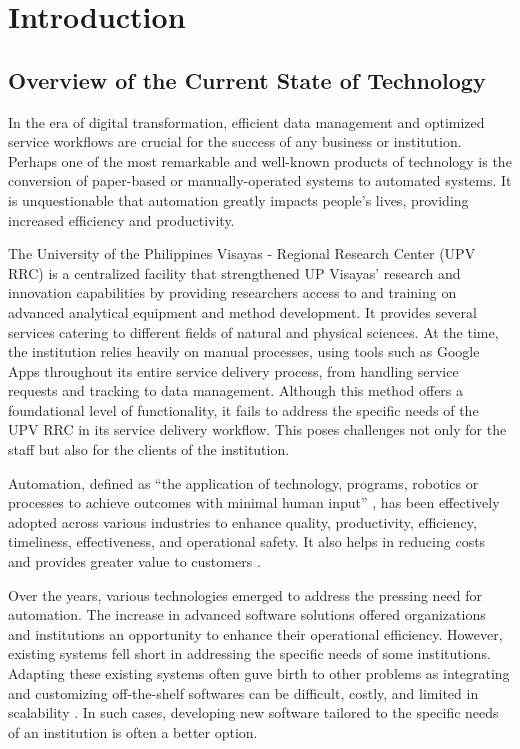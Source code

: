 \chapter{Introduction}
\label{sec:researchdesc}    %

\section{Overview of the Current State of Technology}
\label{sec:overview}


In the era of digital transformation, efficient data management and optimized service workflows are crucial for the success of any business or institution. Perhaps one of the most remarkable and well-known products of technology is the conversion of paper-based or manually-operated systems to automated systems. It is unquestionable that automation greatly impacts people's lives, providing increased efficiency and productivity.

The University of the Philippines Visayas - Regional Research Center (UPV RRC) is a centralized facility that strengthened UP Visayas’ research and innovation capabilities by providing researchers access to and training on advanced analytical equipment and method development. It provides several services catering to different fields of natural and physical sciences. At the time, the institution relies heavily on manual processes, using tools such as Google Apps throughout its entire service delivery process, from handling service requests and tracking to data management. Although this method offers a foundational level of functionality, it fails to address the specific needs of the UPV RRC in its service delivery workflow. This poses challenges not only for the staff but also for the clients of the institution.

Automation, defined as “the application of technology, programs, robotics or processes to achieve outcomes with minimal human input” \cite{ibm}, has been effectively adopted across various industries to enhance quality, productivity, efficiency, timeliness, effectiveness, and operational safety. It also helps in reducing costs and provides greater value to customers \cite{caban2021}. 

Over the years, various technologies emerged to address the pressing need for automation. The increase in advanced software solutions offered organizations and institutions an opportunity to enhance their operational efficiency. However, existing systems fell short in addressing the specific needs of some institutions. Adapting these existing systems often guve birth to other problems as integrating and customizing off-the-shelf softwares can be difficult, costly, and limited in scalability \cite{bitcat2023}. In such cases, developing new software tailored to the specific needs of an institution is often a better option.

